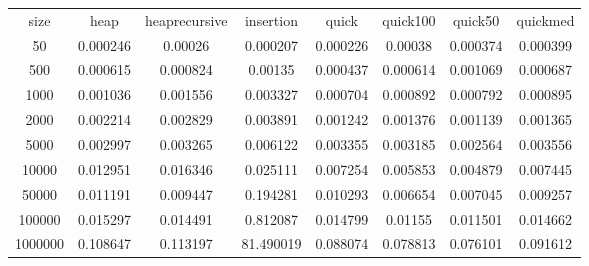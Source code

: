 \begin{table}
\begin{tabular}{cccccccc}
size & heap & heaprecursive & insertion & quick & quick100 & quick50 & quickmed \\
50 & 0.000246 & 0.00026 & 0.000207 & 0.000226 & 0.00038 & 0.000374 & 0.000399 \\
500 & 0.000615 & 0.000824 & 0.00135 & 0.000437 & 0.000614 & 0.001069 & 0.000687 \\
1000 & 0.001036 & 0.001556 & 0.003327 & 0.000704 & 0.000892 & 0.000792 & 0.000895 \\
2000 & 0.002214 & 0.002829 & 0.003891 & 0.001242 & 0.001376 & 0.001139 & 0.001365 \\
5000 & 0.002997 & 0.003265 & 0.006122 & 0.003355 & 0.003185 & 0.002564 & 0.003556 \\
10000 & 0.012951 & 0.016346 & 0.025111 & 0.007254 & 0.005853 & 0.004879 & 0.007445 \\
50000 & 0.011191 & 0.009447 & 0.194281 & 0.010293 & 0.006654 & 0.007045 & 0.009257 \\
100000 & 0.015297 & 0.014491 & 0.812087 & 0.014799 & 0.01155 & 0.011501 & 0.014662 \\
1000000 & 0.108647 & 0.113197 & 81.490019 & 0.088074 & 0.078813 & 0.076101 & 0.091612 \\
\end{tabular}
\end{table}
